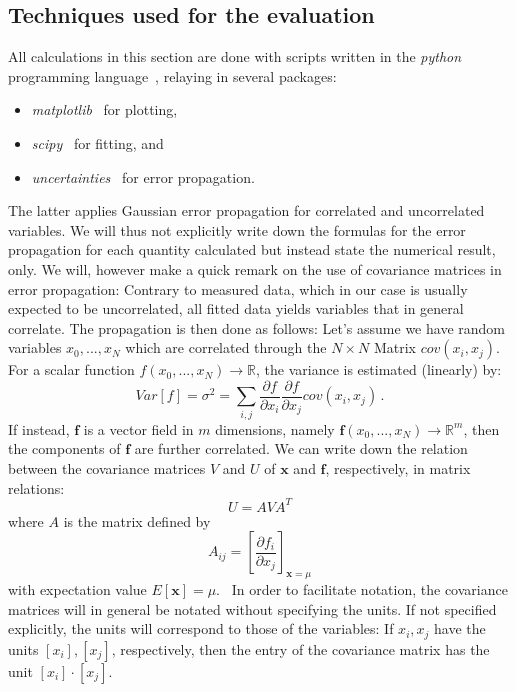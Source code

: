 \subsection{Techniques used for the evaluation}
All calculations in this section are done with scripts written in 
the \textit{python} programming language~\cite{python}, relaying in several 
packages:
\begin{itemize}
    \item
        \textit{matplotlib}~\cite{Hunter2007} for plotting,
    \item
        \textit{scipy}~\cite{scipy} for fitting, and 
    \item
        \textit{uncertainties}~\cite{uc} for error propagation.
\end{itemize}
The latter applies Gaussian error propagation for correlated and uncorrelated variables. 
We will thus not explicitly write down the formulas for the error propagation 
for each quantity calculated but instead state the numerical result, only. 
We will, however make a quick remark on the use of covariance matrices in 
error propagation: Contrary to measured data, which in our case is usually 
expected to be uncorrelated, all fitted data yields variables that in general correlate. 
The propagation is then done as follows:
Let's assume we have random
variables $x_0,...,x_N$ which are correlated through the $N\times N$ Matrix $cov(x_i,x_j)$.
For a scalar function $f(x_0,...,x_N) \rightarrow \mathbb{R}$, the variance is estimated (linearly) by:
\begin{equation}
Var[f] = \sigma^2 = \sum_{i,j} \frac{\partial f}{\partial x_i} \frac{\partial f}{\partial x_j} cov(x_i,x_j) \,.
\end{equation} 
If instead, $\mathbf{f}$ is a vector field in $m$ dimensions, namely 
$\mathbf{f}(x_0,...,x_N) \rightarrow \mathbb{R}^m$, then the components of $\mathbf{f}$ 
are further correlated. We can write down the relation between the covariance matrices $V$ and $U$ of 
$\mathbf{x}$ and $\mathbf{f}$, respectively, in matrix relations:
\begin{equation}
    U = A V A^T
\end{equation}
where $A$ is the matrix defined by 
\begin{equation}
    A_{ij} = \left[ \frac{\partial f_i}{\partial x_j}\right]_{\mathbf{x} = \mu}
\end{equation}
with expectation value $E[\mathbf{x}] = \mu$.~\cite{cowan1998statistical}
In order to facilitate notation, the covariance matrices will in general be notated without 
specifying the units. If not specified explicitly, the units will correspond to those of the
variables: If $x_i, x_j$ have the units $[x_i], [x_j]$, respectively, 
then the entry of the covariance matrix has the unit $[x_i] \cdot [x_j]$. 



